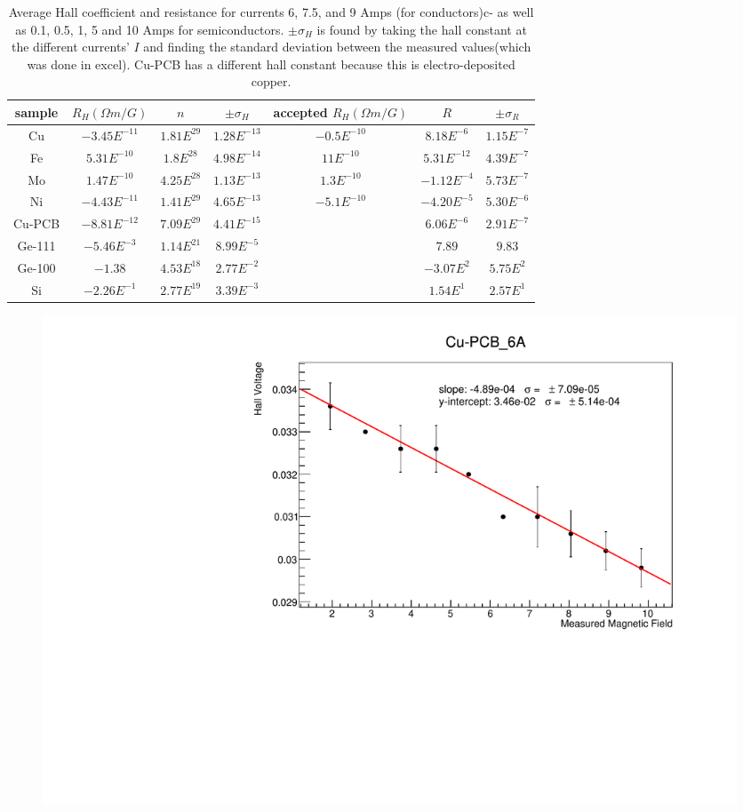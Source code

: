 \documentclass[a4paper,12pt,english]{all-in-one} %
\begin{document}
\begin{table}[]
\centering
\begin{tabular}{c|c|c|c|c|c|c} 
sample & $R_H ({\Omega} m/G)$  & $n$ &  $\pm \sigma_{H}$ & accepted $R_H ({\Omega}m/G)$ & $R$ & $\pm \sigma_{R}$ \\ \hline

Cu & $-3.45E^{-11}$ & $1.81E^{29}$  &$1.28E^{-13}$ & $-0.5E^{-10}$ & $8.18E^{-6}$ & $1.15E^{-7}$ \\
Fe & $5.31E^{-10}$ & $1.8E^{28}$ & $4.98E^{-14}$ & $11E^{-10}$ & $5.31E^{-12}$ & $4.39E^{-7}$ \\
Mo & $1.47E^{-10}$ & $4.25E^{28}$ & $1.13E^{-13}$ & $1.3E^{-10}$ & $-1.12E^{-4}$ & $5.73E^{-7}$ \\
Ni & $-4.43E^{-11}$ & $1.41E^{29}$ & $4.65E^{-13}$ & $-5.1E^{-10}$ & $-4.20E^{-5}$ & $5.30E^{-6}$ \\
Cu-PCB & $-8.81E^{-12}$ & $7.09E^{29}$ &  $4.41E^{-15}$ & & $6.06E^{-6}$ & $2.91E^{-7}$ \\
Ge-111 & $-5.46E^{-3}$ & $1.14E^{21}$ & $8.99E^{-5}$ & & $7.89$ & $9.83$ \\
Ge-100 & $-1.38$ & $4.53E^{18} $ & $2.77E^{-2}$ & &  $-3.07E^{2}$ & $5.75E^{2}$ \\
Si & $-2.26E^{-1}$ & $2.77E^{19}$ & $3.39E^{-3}$ & & $1.54E^{1}$ & $2.57E^{1}$ \\
\end{tabular}
\caption{Average Hall coefficient and resistance for currents 6, 7.5, and 9 Amps (for conductors)c- as well as 0.1, 0.5, 1, 5 and 10 Amps for semiconductors. $\pm \sigma_{H}$ is found by taking the hall constant at the different currents' $I$ and finding the standard deviation between the measured values(which was done in excel). Cu-PCB has a different hall constant because this is electro-deposited copper.
}
\label{tab:hall_hv_resis}
\end{table}

\begin{figure}[tbh]
    \centering
    \includegraphics[width=0.8\linewidth]{4-hall_effect/overleaf/images/Cu-PCB_6A_run1.pdf}
    \caption{ \scriptsize{ 
    }}
    \label{fig:xray-diagram}
\end{figure}
\end{document}
